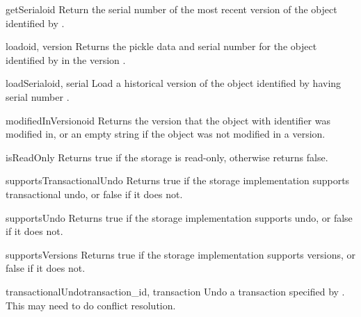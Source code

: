 \documentclass{howto}
\begin{document}
\begin{methoddesc}{getSerial}{oid}
  Return the serial number of the most recent version of the object
  identified by .
\end{methoddesc}

\begin{methoddesc}{load}{oid, version}
  Returns the pickle data and serial number for the object identified
  by  in the version .
\end{methoddesc}

\begin{methoddesc}{loadSerial}{oid, serial}
  Load a historical version of the object identified by 
  having serial number .
\end{methoddesc}

\begin{methoddesc}{modifiedInVersion}{oid}
  Returns the version that the object with identifier  was
  modified in, or an empty string if the object was not modified in a
  version.
\end{methoddesc}

\begin{methoddesc}{isReadOnly}{}
  Returns true if the storage is read-only, otherwise returns false.
\end{methoddesc}

\begin{methoddesc}{supportsTransactionalUndo}{}
  Returns true if the storage implementation supports transactional
  undo, or false if it does not.
\end{methoddesc}

\begin{methoddesc}{supportsUndo}{}
  Returns true if the storage implementation supports undo, or false
  if it does not.
\end{methoddesc}

\begin{methoddesc}{supportsVersions}{}
  Returns true if the storage implementation supports versions, or
  false if it does not.
\end{methoddesc}

\begin{methoddesc}{transactionalUndo}{transaction_id, transaction}
  Undo a transaction specified by .  This may need
  to do conflict resolution.
\end{methoddesc}
\end{document}
